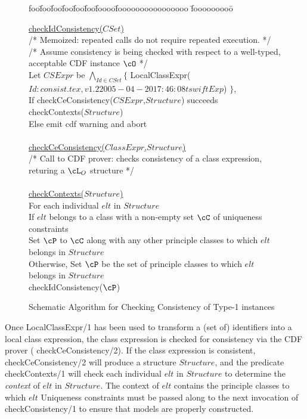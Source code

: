 \begin{figure}[htbp]
\longline
{\sf
\begin{tabbing}
foo\=foo\=foo\=foo\=foo\=foo\=foooo\=foooooooooooooooo \=fooooooooo\=\kill

\> \underline{checkIdConsistency($CSet$)}  \\
\> \> 	{\rm /* Memoized: repeated calls do
		not require repeated execution.  */ }\\
\> \> 	{\rm /* Assume consistency is being checked with respect to a
		well-typed, acceptable CDF instance $\cO$ */} \\
\> \> 	Let $CSExpr$ be $\bigwedge_{Id \in CSet} \{$ 
			LocalClassExpr($Id: consist.tex,v 1.2 2005-04-20 17:46:08 tswift Exp $) $\}$,  \\
\> \> 	If checkCeConsistency($CSExpr$,$Structure$) succeeds  \\
\> \> \> 	    checkContexts($Structure$) \\
\> \>     Else emit cdf warning and abort \\
\\
\> \underline{checkCeConsistency($ClassExpr$,$Structure$)} \\
\> \> {\rm /*  Call to CDF prover: checks consistency of a class
	         expression, returing a $\cL_O$ structure */} \\
\\
\> \underline{checkContexts($Structure$)}  \\
\> \> For each individual $elt$ in $Structure$ \\
\> \> \> If $elt$ belongs to a class with a non-empty set $\cC$ of
			uniqueness constraints \\
\> \> \> \> Set $\cP$ to $\cC$ along with any other principle classes to
		which  $elt$ belongs in $Structure$ \\ 
\> \> \> Otherwise, Set $\cP$ be the set of 
		principle classes to which $elt$ belongs in $Structure$ \\ 
\> \> \> checkIdConsistency($\cP$) \\
\end{tabbing}
}
\caption{Schematic Algorithm for Checking Consistency of Type-1 instances}
\label{fig:type1cc}
\longline
\end{figure}

Once {\sf LocalClassExpr/1} has been used to transform a (set of)
identifiers into a local class expression, the class expression is
checked for consistency via the CDF prover ({\sf
checkCeConsistency/2}).  If the class expression is consistent, {\sf
checkCeConsistency/2} will produce a structure $Structure$, and the
predicate {\sf checkContexts/1} will check each individual $elt$ in
$Structure$ to determine the {\em context} of $elt$ in $Structure$.
The context of $elt$ contains the principle classes to which $elt$
Uniqueness constraints must be passed along to the next invocation of
{\sf checkConsistency/1} to ensure that models are properly
constructed.

